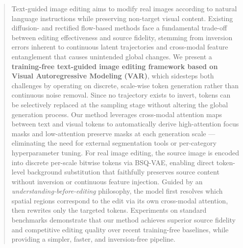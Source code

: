 

\begin{abstract}
Text-guided image editing aims to modify real images according to natural language instructions while preserving non-target visual content. Existing diffusion- and rectified flow-based methods face a fundamental trade-off between editing effectiveness and source fidelity, stemming from inversion errors inherent to continuous latent trajectories and cross-modal feature entanglement that causes unintended global changes. We present a \textbf{training-free text-guided image editing framework based on Visual Autoregressive Modeling (VAR)}, which sidesteps both challenges by operating on discrete, scale-wise token generation rather than continuous noise removal. Since no trajectory exists to invert, tokens can be selectively replaced at the sampling stage without altering the global generation process. Our method leverages cross-modal attention maps between text and visual tokens to automatically derive high-attention focus masks and low-attention preserve masks at each generation scale — eliminating the need for external segmentation tools or per-category hyperparameter tuning. For real image editing, the source image is encoded into discrete per-scale bitwise tokens via BSQ-VAE, enabling direct token-level background substitution that faithfully preserves source content without inversion or continuous feature injection. Guided by an \textit{understanding-before-editing} philosophy, the model first resolves which spatial regions correspond to the edit via its own cross-modal attention, then rewrites only the targeted tokens. Experiments on standard benchmarks demonstrate that our method achieves superior source fidelity and competitive editing quality over recent training-free baselines, while providing a simpler, faster, and inversion-free pipeline.
\end{abstract}

